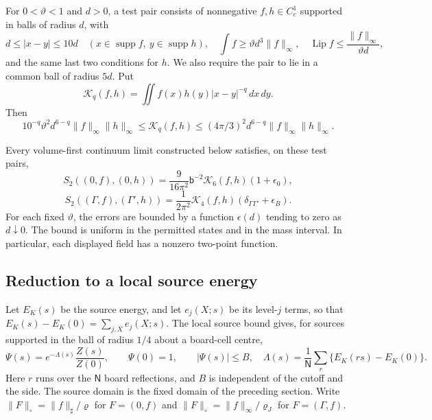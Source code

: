 \documentclass[11pt,letterpaper,reqno]{amsart}
\makeatletter
\theoremstyle{definition}
\newcommand{\ms@minorstart}{%
  \pushQED{\qed}\renewcommand{\qedsymbol}{$\blacksquare$}}
\newenvironment{proposition}[1][]{\ms@minorstart\ms@proposition[#1]}
  {\popQED\endms@proposition}
\theoremstyle{remark}
\makeatother
\begin{document}
For $0<\vartheta<1$ and $d>0$, a test pair consists of nonnegative
$f,h\in C^1_c$ supported in balls of radius $d$, with
\[
 d\le |x-y|\le10d\quad(x\in\operatorname{supp}f,\ y\in\operatorname{supp}h),
 \quad \int f\ge\vartheta d^3\|f\|_\infty,
 \quad \operatorname{Lip}f\le\frac{\|f\|_\infty}{\vartheta d},
\]
and the same last two conditions for $h$. We also require the pair to lie in a common
ball of radius $5d$. Put
\[
 \mathcal K_q(f,h)=\iint f(x)h(y)|x-y|^{-q}\,dx\,dy.
\]
Then
\begin{equation}\label{eq:qcd-template-lower}
 10^{-q}\vartheta^2d^{6-q}\|f\|_\infty\|h\|_\infty
 \le\mathcal K_q(f,h)
 \le(4\pi/3)^2d^{6-q}\|f\|_\infty\|h\|_\infty.
\end{equation}

\begin{proposition}[The two leading kernels]\label{C-408-27}
Every volume-first continuum limit constructed below satisfies, on
these test pairs,
\[
 S_2((0,f),(0,h))=\frac9{16\pi^2}\mathsf b^{-2}
                  \mathcal K_6(f,h)(1+\epsilon_0),
\]
\[
 S_2((\Gamma,f),(\Gamma',h))=\frac1{2\pi^2}
                  \mathcal K_4(f,h)(\delta_{\Gamma\Gamma'}+\epsilon_B).
\]
For each fixed $\vartheta$, the errors are bounded by a function
$\epsilon(d)$ tending to zero as $d\downarrow0$. The bound is
uniform in the permitted states and in the mass interval. In
particular, each displayed field has a nonzero two-point function.
\end{proposition}

\subsection{Reduction to a local source energy}

Let $E_K(s)$ be the source energy, and let $e_j(X;s)$ be its
level-$j$ terms, so that $E_K(s)-E_K(0)=\sum_{j,X}e_j(X;s)$.
The local source bound gives, for sources supported in the ball
of radius $1/4$ about a board-cell centre,
\begin{equation}\label{eq:qcd-cell-holomorphic-bound}
 \Psi(s)=e^{-\Lambda(s)}\frac{Z(s)}{Z(0)},\qquad
 \Psi(0)=1,\qquad |\Psi(s)|\le B,
 \quad
 \Lambda(s)=\frac1{\mathsf N}\sum_{r}\{E_K(rs)-E_K(0)\}.
\end{equation}
Here $r$ runs over the $\mathsf N$ board reflections, and $B$
is independent of the cutoff and the side. The source domain is
the fixed domain of the preceding section. Write
$\|F\|_\circ=\|f\|_\sharp/\varrho$ for $F=(0,f)$ and
$\|F\|_\circ=\|f\|_\infty/\varrho_J$ for $F=(\Gamma,f)$.
\end{document}
